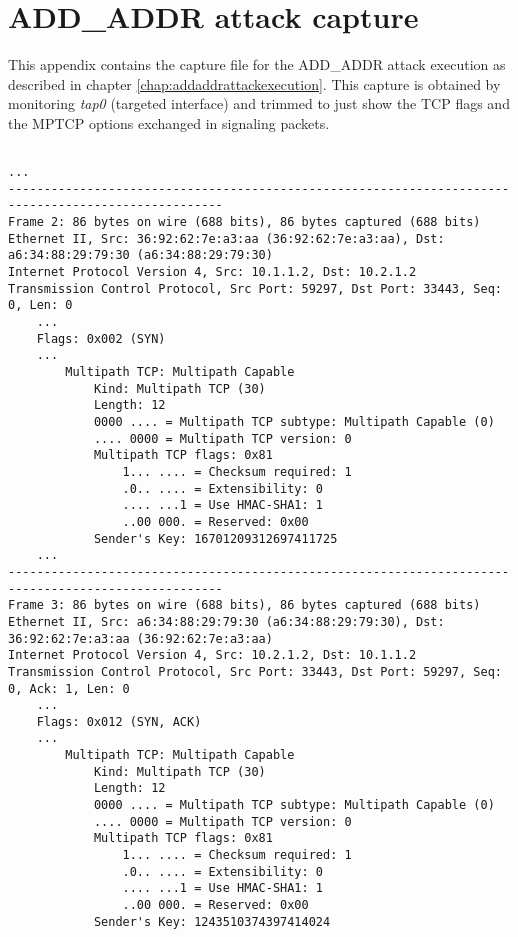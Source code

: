 \chapter{ADD\_ADDR attack capture}
\label{app:a}

This appendix contains the capture file for the ADD\_ADDR attack execution as described in chapter \ref{chap:addaddrattackexecution}. This capture is obtained by monitoring \textit{tap0} (targeted interface) and trimmed to just show the TCP flags and the MPTCP options exchanged in signaling packets.

\begingroup
    \fontsize{8pt}{9pt}\selectfont
	\begin{verbatim}

...
----------------------------------------------------------------------------------------------------
Frame 2: 86 bytes on wire (688 bits), 86 bytes captured (688 bits)
Ethernet II, Src: 36:92:62:7e:a3:aa (36:92:62:7e:a3:aa), Dst: a6:34:88:29:79:30 (a6:34:88:29:79:30)
Internet Protocol Version 4, Src: 10.1.1.2, Dst: 10.2.1.2
Transmission Control Protocol, Src Port: 59297, Dst Port: 33443, Seq: 0, Len: 0
    ...
    Flags: 0x002 (SYN)
    ...
        Multipath TCP: Multipath Capable
            Kind: Multipath TCP (30)
            Length: 12
            0000 .... = Multipath TCP subtype: Multipath Capable (0)
            .... 0000 = Multipath TCP version: 0
            Multipath TCP flags: 0x81
                1... .... = Checksum required: 1
                .0.. .... = Extensibility: 0
                .... ...1 = Use HMAC-SHA1: 1
                ..00 000. = Reserved: 0x00
            Sender's Key: 16701209312697411725
    ...
----------------------------------------------------------------------------------------------------
Frame 3: 86 bytes on wire (688 bits), 86 bytes captured (688 bits)
Ethernet II, Src: a6:34:88:29:79:30 (a6:34:88:29:79:30), Dst: 36:92:62:7e:a3:aa (36:92:62:7e:a3:aa)
Internet Protocol Version 4, Src: 10.2.1.2, Dst: 10.1.1.2
Transmission Control Protocol, Src Port: 33443, Dst Port: 59297, Seq: 0, Ack: 1, Len: 0
    ...
    Flags: 0x012 (SYN, ACK)
    ...
        Multipath TCP: Multipath Capable
            Kind: Multipath TCP (30)
            Length: 12
            0000 .... = Multipath TCP subtype: Multipath Capable (0)
            .... 0000 = Multipath TCP version: 0
            Multipath TCP flags: 0x81
                1... .... = Checksum required: 1
                .0.. .... = Extensibility: 0
                .... ...1 = Use HMAC-SHA1: 1
                ..00 000. = Reserved: 0x00
            Sender's Key: 1243510374397414024

\end{verbatim}
